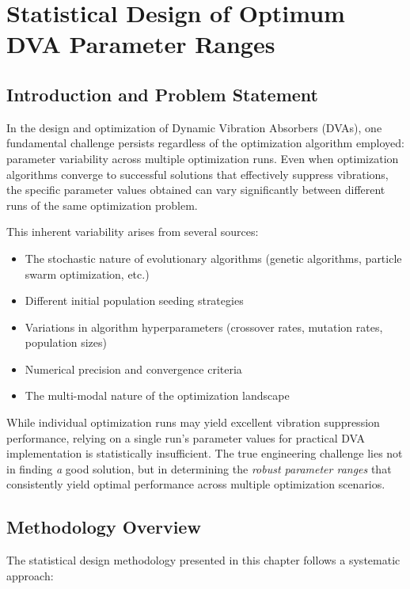 \documentclass[../main.tex]{subfiles}
\begin{document}
\chapter{Statistical Design of Optimum DVA Parameter Ranges}

\section{Introduction and Problem Statement}

In the design and optimization of Dynamic Vibration Absorbers (DVAs), one fundamental challenge persists regardless of the optimization algorithm employed: parameter variability across multiple optimization runs. Even when optimization algorithms converge to successful solutions that effectively suppress vibrations, the specific parameter values obtained can vary significantly between different runs of the same optimization problem.

This inherent variability arises from several sources:
\begin{itemize}
    \item The stochastic nature of evolutionary algorithms (genetic algorithms, particle swarm optimization, etc.)
    \item Different initial population seeding strategies
    \item Variations in algorithm hyperparameters (crossover rates, mutation rates, population sizes)
    \item Numerical precision and convergence criteria
    \item The multi-modal nature of the optimization landscape
\end{itemize}

While individual optimization runs may yield excellent vibration suppression performance, relying on a single run's parameter values for practical DVA implementation is statistically insufficient. The true engineering challenge lies not in finding \textit{a} good solution, but in determining the \textit{robust parameter ranges} that consistently yield optimal performance across multiple optimization scenarios.

\section{Methodology Overview}

The statistical design methodology presented in this chapter follows a systematic approach:
\end{document}
